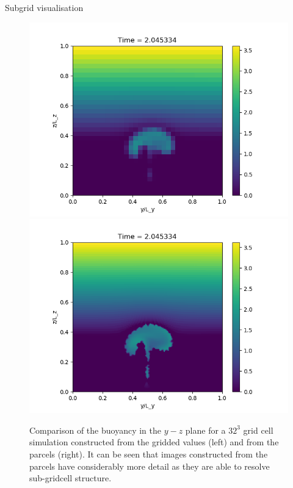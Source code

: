 \documentclass{beamer}
\begin{document}
\begin{frame}{Subgrid visualisation}

\begin{figure}
  \begin{center}
    \includegraphics[scale=0.3]{pmpic_images/32grid.png}
    \includegraphics[scale=0.3]{pmpic_images/32parcels.png}
  \end{center}
  \caption{Comparison of the buoyancy in the $y-z$ plane for a $32^3$ grid cell simulation constructed from the gridded values (left) and from the parcels (right). It can be seen that images constructed from the parcels have considerably more detail as they are able to resolve sub-gridcell structure. \label{lowres}}
\end{figure}

\end{frame}
\end{document}
